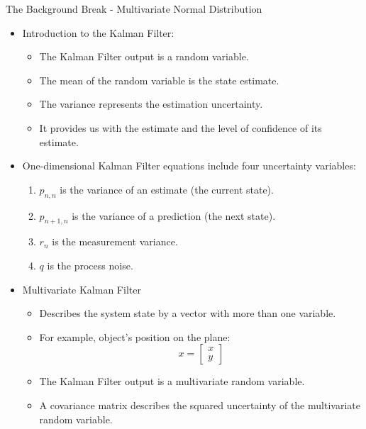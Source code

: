 \begin{frame}{The Background Break - Multivariate Normal Distribution}
\begin{itemize}
\item Introduction to the Kalman Filter: 
    \begin{itemize}
        \item The Kalman Filter output is a random variable.
        \item The mean of the random variable is the state estimate.
        \item The variance represents the estimation uncertainty.
        \item It provides us with the estimate and the level of confidence of its estimate.
    \end{itemize}
\item One-dimensional Kalman Filter equations include four uncertainty variables:
    \begin{enumerate}
        \item \(p_{n,n}\) is the variance of an estimate (the current state).
        \item \(p_{n+1,n}\) is the variance of a prediction (the next state).
        \item \(r_n\) is the measurement variance.
        \item \(q\) is the process noise.
    \end{enumerate}

\item Multivariate Kalman Filter
    \begin{itemize}
        \item Describes the system state by a vector with more than one variable.
        \item For example, object’s position on the plane: \[x = \begin{bmatrix} x \\ y \end{bmatrix}\] 
        \item The Kalman Filter output is a multivariate random variable.
        \item A covariance matrix describes the squared uncertainty of the multivariate random variable.
    \end{itemize}


\end{itemize}
\end{frame}
